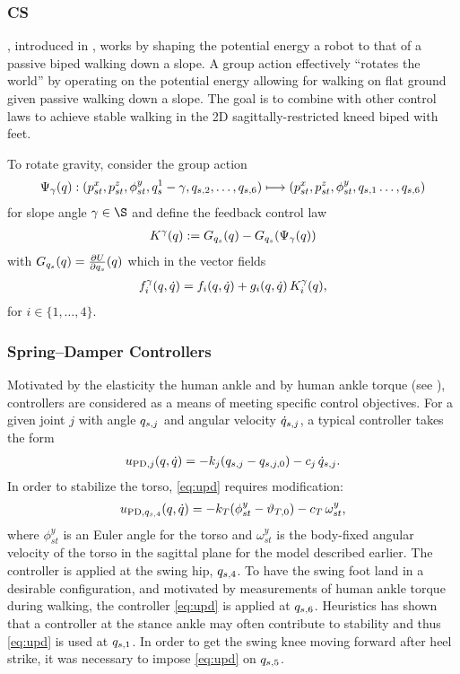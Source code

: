 \subsubsection{CS}
\Cs, introduced in \cite{Spong2005}, works by shaping the potential energy a robot
to that of a passive biped walking down a slope.
% 
A group action effectively ``rotates the world'' by operating on the potential
energy allowing for walking on flat ground given passive walking down a slope.
% 
The goal is to combine \csx with other control laws to achieve stable walking in
the 2D sagittally-restricted kneed biped with feet.

To rotate gravity, consider the group action
\begin{align*}
  \Psi_\gamma(q) : (p_{st}^x, p_{st}^z, \phi_{st}^{y},
  q_{s}^{1} - \gamma, q_{s,2}, \ldots, q_{s,6}) \longmapsto (p_{st}^x, p_{st}^z,
  \phi_{st}^{y}, q_{s,1} \ldots, q_{s,6})
\end{align*}
for slope angle $\gamma \in \S$ and define the feedback control law
\begin{align*}
  K^{\gamma}(q):= G_{q_{s}}(q) - G_{q_{s}}(\Psi_{\gamma}(q))
\end{align*}
with $G_{q_{s}}(q) = \frac{\partial{U}}{\partial{q_{s}}}(q)$ which in the vector fields
\begin{align}
  \label{eq:frig}
  f_{i}^{\gamma}(q, \dot{q}) = f_{i}(q, \dot{q}) + g_{i}(q, \dot{q}) \, K^{\gamma}_{i}(q),
\end{align}
for $i \in \{1, \ldots, 4\}$.

\subsubsection{Spring--Damper Controllers}

Motivated by the elasticity the human ankle and by human ankle torque (see
\cite{Au2009}), \PDx controllers are considered as a means of meeting specific
control objectives.
%
For a given joint $j$ with angle $q_{s,j}$ and angular velocity $\dot{q}_{s,j}$, a
typical \PDx controller takes the form
\begin{align}
  \label{eq:upd}
  u_{\mathrm{PD}, j}(q, \dot{q}) = -k_{j} (q_{s,j} - q_{s,j,0}) - c_{j} \,
  \dot{q}_{s,j}.
\end{align}
%
In order to stabilize the torso, \eqref{eq:upd} requires modification:
\begin{align*}
  u_{\mathrm{PD}, q_{s,4}}(q, \dot{q}) = -k_{T} (\phi_{st}^{y} - \vartheta_{T,0}) - c_{T} \,
  \omega_{st}^{y},
\end{align*}
where $\phi_{st}^{y}$ is an Euler angle for the torso and $\omega_{st}^{y}$ is
the body-fixed angular velocity of the torso in the sagittal plane for the model
described earlier.
%
The controller is applied at the swing hip, $q_{s,4}$.
%
To have the swing foot land in a desirable configuration, and motivated by
measurements of human ankle torque during walking, the \PDx controller
\eqref{eq:upd} is applied at $q_{s,6}$.
%
Heuristics has shown that a \PDx controller at the stance ankle may often
contribute to stability and thus \eqref{eq:upd} is used at $q_{s,1}$.
%
In order to get the swing knee moving forward after heel strike, it was
necessary to impose \eqref{eq:upd} on $q_{s,5}$.

